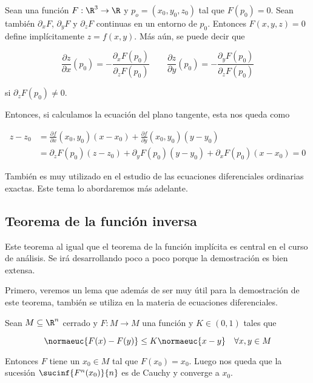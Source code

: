 \begin{ejem}
    Sean una función $F: \R^3 \rightarrow \R$ y $p_o = (x_0, y_0, z_0)$ tal que $F(p_0) = 0$. Sean también $\partial_xF$, $\partial_yF$ y $\partial_zF$ continuas en un entorno de $p_0$. Entonces $F(x,y,z) = 0$ define implícitamente $z = f(x,y)$. Más aún, se puede decir que
    
    \[
    \frac{\partial z}{\partial x}(p_0) = - \frac{\partial_xF(p_0)}{\partial_zF(p_0)}
    \qquad
    \frac{\partial z}{\partial y}(p_0) = - \frac{\partial_yF(p_0)}{\partial_zF(p_0)}
    \]
    
    \noindent si $\partial_zF(p_0) \neq 0$.
    
    Entonces, si calculamos la ecuación del plano tangente, esta nos queda como
    
    \begin{align*}
        z - z_0 &= \frac{\partial f}{\partial x}(x_0,y_0)(x-x_0) + \frac{\partial f}{\partial y}(x_0,y_0)(y-y_0) \\
            &= \partial_zF(p_0)(z-z_0) + \partial_yF(p_0)(y-y_0) + \partial_xF(p_0)(x-x_0) = 0
    \end{align*}
\end{ejem}

\begin{ejem}
    También es muy utilizado en el estudio de las ecuaciones diferenciales ordinarias exactas. Este tema lo abordaremos más adelante.
\end{ejem}

\subsection{Teorema de la función inversa}

Este teorema al igual que el teorema de la función implícita es central en el curso de análisis. Se irá desarrollando poco a poco porque la demostración es bien extensa.

Primero, veremos un lema que además de ser muy útil para la demostración de este teorema, también se utiliza en la materia de ecuaciones diferenciales.

\begin{lem}\label{lem:4.1.1}
    Sean $M \subseteq \R^n$ cerrado y $F: M \rightarrow M$ una función y $K \in (0,1)$ tales que
    
    \[
    \normaeuc{F(x) - F(y)} \leq K\normaeuc{x - y} \quad \forall x,y \in M
    \]
    
    Entonces $F$ tiene un $x_0 \in M$ tal que $F(x_0) = x_0$. Luego nos queda que la sucesión $\sucinf{F^n(x_0)}{n}$ es de Cauchy y converge a $x_0$.
\end{lem}

